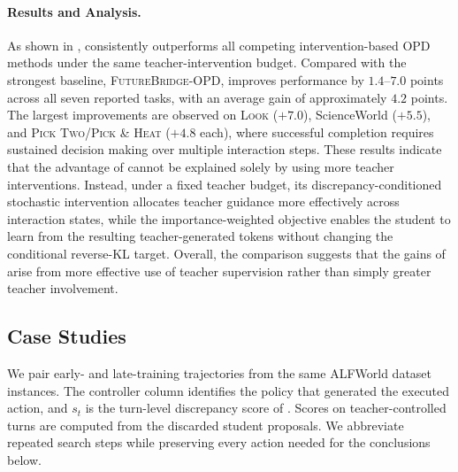 \paragraph{Results and Analysis.}
As shown in , \name consistently outperforms all competing intervention-based OPD methods under the same teacher-intervention budget.
Compared with the strongest baseline, \textsc{FutureBridge-OPD}, \name improves performance by $1.4$--$7.0$ points across all seven reported tasks, with an average gain of approximately $4.2$ points.
The largest improvements are observed on \textsc{Look} ($+7.0$), ScienceWorld ($+5.5$), and \textsc{Pick Two}/\textsc{Pick \& Heat} ($+4.8$ each), where successful completion requires sustained decision making over multiple interaction steps.
These results indicate that the advantage of \name cannot be explained solely by using more teacher interventions.
Instead, under a fixed teacher budget, its discrepancy-conditioned stochastic intervention allocates teacher guidance more effectively across interaction states, while the importance-weighted objective enables the student to learn from the resulting teacher-generated tokens without changing the conditional reverse-KL target.
Overall, the comparison suggests that the gains of \name arise from more effective use of teacher supervision rather than simply greater teacher involvement.


\subsection{Case Studies} 
\label{app:case_studies}

We pair early- and late-training trajectories from the same ALFWorld dataset instances. 
The controller column identifies the policy that generated the executed action, and $s_t$ is the turn-level discrepancy score of . 
Scores on teacher-controlled turns are computed from the discarded student proposals. 
We abbreviate repeated search steps while preserving every action needed for the conclusions below.

